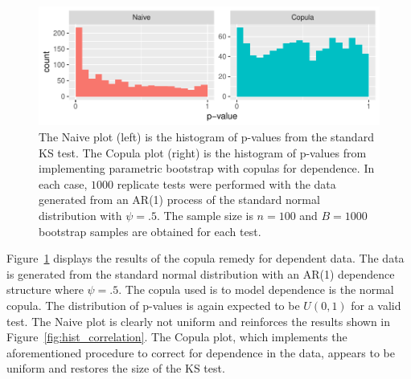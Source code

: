 \documentclass[12pt, letterpaper, titlepage]{article}
\begin{document}
\begin{figure}[tbp]
  \centering
  \includegraphics[width=\textwidth]{hist_ar1_D}
  \caption{The Naive plot (left) is the histogram of p-values from the 
  standard KS test. The Copula plot (right) is the histogram of p-values from 
  implementing parametric bootstrap with copulas for dependence. In each case, 
  $1000$ replicate tests were performed with the data generated from an AR(1) 
  process of the standard normal distribution with $\psi = .5$. The sample size 
  is $n = 100$ and $B = 1000$ bootstrap samples are obtained for each test.}
  \label{fig:hist_ar1_D}
\end{figure}

Figure~\ref{fig:hist_ar1_D} displays the results of the copula remedy for 
dependent data. The data is generated from the standard normal distribution with
an AR(1) dependence structure where $\psi = .5$. The copula used is to model 
dependence is the normal copula. The distribution of p-values is again expected
to be $U(0, 1)$ for a valid test. The Naive plot is clearly not uniform and 
reinforces the results shown in Figure~\ref{fig:hist_correlation}. The Copula 
plot, which implements the aforementioned procedure to correct for dependence
in the data, appears to be uniform and restores the size of the KS test.
\end{document}

